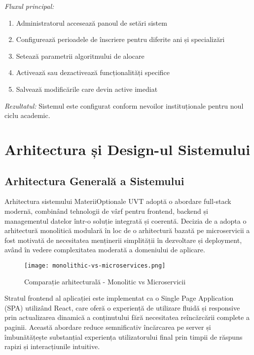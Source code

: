 \documentclass[12pt,a4paper]{report}
\begin{document}
\textit{Fluxul principal:}
\begin{enumerate}
\item Administratorul accesează panoul de setări sistem
\item Configurează perioadele de înscriere pentru diferite ani și specializări
\item Setează parametrii algoritmului de alocare
\item Activează sau dezactivează funcționalități specifice
\item Salvează modificările care devin active imediat
\end{enumerate}

\textit{Rezultatul:} Sistemul este configurat conform nevoilor instituționale pentru noul ciclu academic.

\chapter{Arhitectura și Design-ul Sistemului}

\section{Arhitectura Generală a Sistemului}

Arhitectura sistemului MateriiOptionale UVT adoptă o abordare full-stack modernă, combinând tehnologii de vârf pentru frontend, backend și managementul datelor într-o soluție integrată și coerentă. Decizia de a adopta o arhitectură monolitică modulară în loc de o arhitectură bazată pe microservicii a fost motivată de necesitatea menținerii simplității în dezvoltare și deployment, având în vedere complexitatea moderată a domeniului de aplicare.

\begin{figure}[H]
\centering
\texttt{[image: monolithic-vs-microservices.png]}
\caption{Comparație arhitecturală - Monolitic vs Microservicii}
\label{fig:monolithic-microservices}
\end{figure}

Stratul frontend al aplicației este implementat ca o Single Page Application (SPA) utilizând React, care oferă o experiență de utilizare fluidă și responsive prin actualizarea dinamică a conținutului fără necesitatea reîncărcării complete a paginii. Această abordare reduce semnificativ încărcarea pe server și îmbunătățește substanțial experiența utilizatorului final prin timpii de răspuns rapizi și interacțiunile intuitive.
\end{document}
